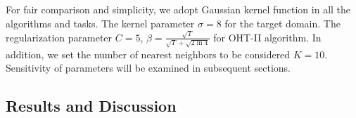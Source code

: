 \documentclass[twocolumn]{article}
\begin{document}
For fair comparison and simplicity, we adopt Gaussian kernel function in all the algorithms and tasks.
The kernel parameter $\sigma = 8$ for the target domain.
The regularization parameter $C = 5$, $ \beta = \frac{\sqrt{T}}{\sqrt{T}+\sqrt{2\ln{4}}} $ for OHT-II algorithm.
In addition, we set the number of nearest neighbors to be considered $K = 10$.
Sensitivity of parameters will be examined in subsequent sections.

\subsection{Results and Discussion}

\end{document}
